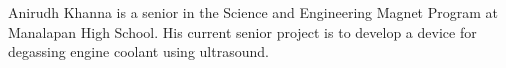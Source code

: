 ﻿\documentclass[10pt,journal,twoside]{IEEEtran}
\begin{document}
\begin{IEEEbiography}{Anirudh Khanna}  is a senior in the Science and Engineering Magnet Program at Manalapan High School. His current senior project is to develop a device for degassing engine coolant using ultrasound. 
\end{IEEEbiography}
\vfill
\end{document}

